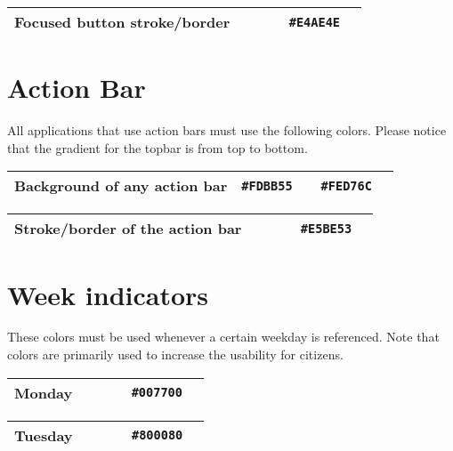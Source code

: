 \begin{table}[!htbp]
	\begin{tabularx}{\textwidth}{X r c r c}
		Focused button stroke/border 
		& ~ & ~
		& \texttt{\#E4AE4E} & \cellcolor[HTML]{E4AE4E}\phantom{--} \\ \hline
	\end{tabularx}
\end{table}


\section{Action Bar}
All applications that use action bars must use the following colors. Please notice that the gradient for the topbar is from top to bottom.

\begin{table}[!htbp]
	\begin{tabularx}{\textwidth}{X r c r c}
		Background of any action bar 
		& \texttt{\#FDBB55} & \cellcolor[HTML]{FDBB55}\phantom{--}
		& \texttt{\#FED76C} & \cellcolor[HTML]{FED76C}\phantom{--} \\ \hline
	\end{tabularx}
\end{table}

\begin{table}[!htbp]
	\begin{tabularx}{\textwidth}{X r c r c}
		Stroke/border of the action bar 
		& ~ & ~
		& \texttt{\#E5BE53} & \cellcolor[HTML]{E5BE53}\phantom{--} \\ \hline
	\end{tabularx}
\end{table}


\section{Week indicators}
These colors must be used whenever a certain weekday is referenced. Note that colors are primarily used to increase the usability for citizens.


\begin{table}[!htbp]
	\begin{tabularx}{\textwidth}{X r c r c}
		Monday 
		& ~ & ~
		& \texttt{\#007700} & \cellcolor[HTML]{007700}\phantom{--} \\ \hline
	\end{tabularx}
\end{table}

\begin{table}[!htbp]
	\begin{tabularx}{\textwidth}{X r c r c}
		Tuesday 
		& ~ & ~
		& \texttt{\#800080} & \cellcolor[HTML]{800080}\phantom{--} \\ \hline
	\end{tabularx}
\end{table}


